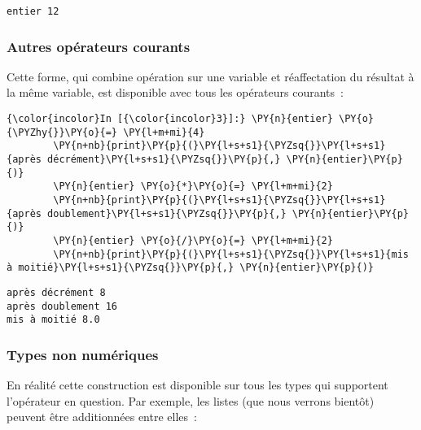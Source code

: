     \begin{Verbatim}[commandchars=\\\{\},frame=single,framerule=0.3mm,rulecolor=\color{cellframecolor}]
entier 12
\end{Verbatim}

    \hypertarget{autres-opuxe9rateurs-courants}{%
\subsubsection{Autres opérateurs
courants}\label{autres-opuxe9rateurs-courants}}

    Cette forme, qui combine opération sur une variable et réaffectation du
résultat à la même variable, est disponible avec tous les opérateurs
courants~:

    \begin{Verbatim}[commandchars=\\\{\},frame=single,framerule=0.3mm,rulecolor=\color{cellframecolor}]
{\color{incolor}In [{\color{incolor}3}]:} \PY{n}{entier} \PY{o}{\PYZhy{}}\PY{o}{=} \PY{l+m+mi}{4}
        \PY{n+nb}{print}\PY{p}{(}\PY{l+s+s1}{\PYZsq{}}\PY{l+s+s1}{après décrément}\PY{l+s+s1}{\PYZsq{}}\PY{p}{,} \PY{n}{entier}\PY{p}{)}
        \PY{n}{entier} \PY{o}{*}\PY{o}{=} \PY{l+m+mi}{2}
        \PY{n+nb}{print}\PY{p}{(}\PY{l+s+s1}{\PYZsq{}}\PY{l+s+s1}{après doublement}\PY{l+s+s1}{\PYZsq{}}\PY{p}{,} \PY{n}{entier}\PY{p}{)}
        \PY{n}{entier} \PY{o}{/}\PY{o}{=} \PY{l+m+mi}{2}
        \PY{n+nb}{print}\PY{p}{(}\PY{l+s+s1}{\PYZsq{}}\PY{l+s+s1}{mis à moitié}\PY{l+s+s1}{\PYZsq{}}\PY{p}{,} \PY{n}{entier}\PY{p}{)}
\end{Verbatim}


    \begin{Verbatim}[commandchars=\\\{\},frame=single,framerule=0.3mm,rulecolor=\color{cellframecolor}]
après décrément 8
après doublement 16
mis à moitié 8.0
\end{Verbatim}

    \hypertarget{types-non-numuxe9riques}{%
\subsubsection{Types non numériques}\label{types-non-numuxe9riques}}

    En réalité cette construction est disponible sur tous les types qui
supportent l'opérateur en question. Par exemple, les listes (que nous
verrons bientôt) peuvent être additionnées entre elles~:

